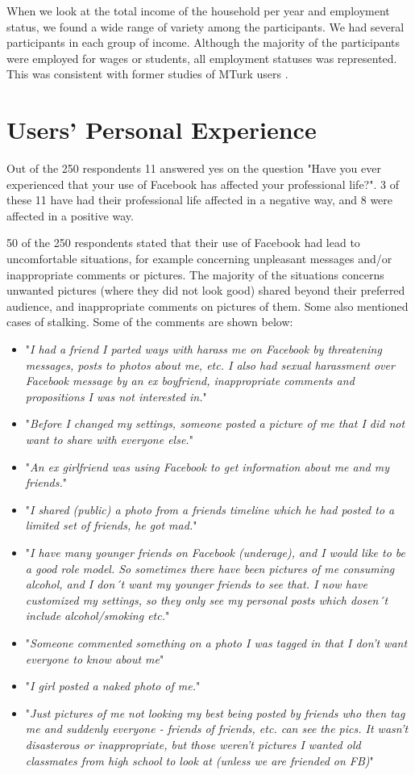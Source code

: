 When we look at the total income of the household per year and employment status, we found a wide range of variety among the participants. We had several participants in each group of income. Although the majority of the participants were employed for wages or students, all employment statuses was represented. This was consistent with former studies of MTurk users \cite{incentivesAmt}.



\section{Users' Personal Experience}
Out of the 250 respondents 11 answered yes on the question "Have you ever experienced that your use of Facebook has affected your professional life?". 3 of these 11 have had their professional life affected in a negative way, and 8 were affected in a positive way. 

50 of the 250 respondents stated that their use of Facebook had lead to uncomfortable situations, for example concerning unpleasant messages and/or inappropriate comments or pictures. The majority of the situations concerns unwanted pictures (where they did not look good) shared beyond their preferred audience, and inappropriate comments on pictures of them. Some also mentioned cases of stalking. Some of the comments are shown below:

\begin{itemize} 
\item "\textit{I had a friend I parted ways with harass me on Facebook by threatening messages, posts to photos about me, etc. I also had sexual harassment over Facebook message by an ex boyfriend, inappropriate comments and propositions I was not interested in.}"
\item "\textit{Before I changed my settings, someone posted a picture of me that I did not want to share with everyone else.}"
\item "\textit{An ex girlfriend was using Facebook to get information about me and my friends.}"
\item "\textit{I shared (public) a photo from a friends timeline which he had posted to a limited set of friends, he got mad.}"
\item "\textit{I have many younger friends on Facebook (underage), and I would like to be a good role model. So sometimes there have been pictures of me consuming alcohol, and I don´t want my younger friends to see that. I now have customized my settings, so they only see my personal posts which dosen´t include alcohol/smoking etc.}"
\item "\textit{Someone commented something on a photo I was tagged in that I don't want everyone to know about me}"
\item "\textit{I girl posted a naked photo of me.}"
\item "\textit{Just pictures of me not looking my best being posted by friends who then tag me and suddenly everyone - friends of friends, etc. can see the pics. It wasn't disasterous or inappropriate, but those weren't pictures I wanted old classmates from high school to look at (unless we are friended on FB)}"
\end{itemize}


